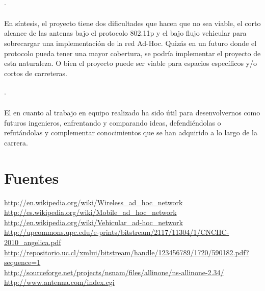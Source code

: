 \documentclass[12pt]{article}
\begin{document}
\paragraph{$\cdot$}En síntesis, el proyecto tiene dos dificultades que hacen que no sea viable, el 
corto alcance de las antenas bajo el protocolo 802.11p y el bajo flujo vehicular para sobrecargar una 
implementación de la red Ad-Hoc. Quizás en un futuro donde el protocolo pueda tener una mayor cobertura, 
se podría implementar el proyecto de esta naturaleza.  O bien el proyecto puede ser viable para 
espacios específicos y/o cortos de carreteras.
\paragraph{$\cdot$}El en cuanto al trabajo en equipo realizado ha sido útil para desenvolvernos como 
futuros ingenieros, enfrentando y comparando ideas, defendiéndolas o refutándolas y complementar 
conocimientos que se han adquirido a lo largo de la carrera.


\newpage

%
\section{Fuentes}
\url{http://en.wikipedia.org/wiki/Wireless_ad_hoc_network}\\

\url{http://es.wikipedia.org/wiki/Mobile_ad_hoc_network}\\

\url{http://en.wikipedia.org/wiki/Vehicular_ad-hoc_network}\\

\url{http://upcommons.upc.edu/e-prints/bitstream/2117/11304/1/CNCIIC-2010_angelica.pdf}\\

\url{http://repositorio.uc.cl/xmlui/bitstream/handle/123456789/1720/590182.pdf?sequence=1}\\

\url{http://sourceforge.net/projects/nsnam/files/allinone/ns-allinone-2.34/}\\

\url{http://www.antenna.com/index.cgi}\\

\end{document}
